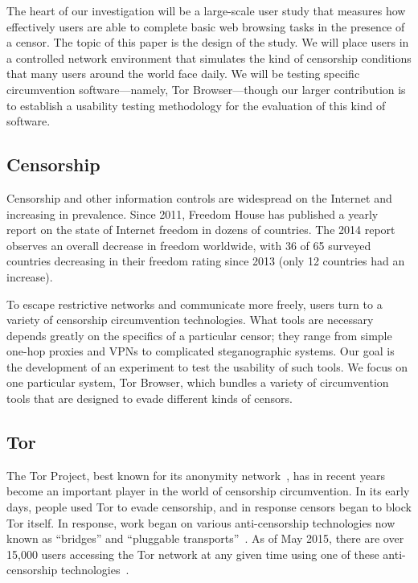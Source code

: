 \documentclass[letterpaper,twocolumn,11pt]{article}
\begin{document}
The heart of our investigation will be a large-scale user study
that measures how effectively users are able to complete
basic web browsing tasks in the presence of a censor.
The topic of this paper is the design of the study.
We will place users in a controlled network environment
that simulates the kind of censorship conditions that many
users around the world face daily.
We will be testing specific circumvention software---namely,
Tor Browser---though our larger contribution is to establish
a usability testing methodology for the evaluation
of this kind of software.

\subsection{Censorship}

\indent \indent Censorship and other information controls
are widespread on the Internet and increasing in prevalence.
Since 2011, Freedom House has published a yearly report
on the state of Internet freedom in dozens of countries.
The 2014 report~\cite{freedom-on-the-net-2014} observes
an overall decrease in freedom worldwide,
with 36 of 65 surveyed countries decreasing in their freedom rating
since 2013 (only 12 countries had an increase).

To escape restrictive networks and communicate more freely,
users turn to a variety of censorship circumvention technologies.
What tools are necessary depends greatly on the specifics of
a particular censor;
they range from simple one-hop proxies and VPNs
to complicated steganographic systems.
Our goal is the development of an experiment
to test the usability of such tools.
We focus on one particular system,
Tor Browser, which bundles a variety of circumvention
tools that are designed to evade different kinds of censors.

\subsection{Tor} 

\indent \indent The Tor Project, best known for its anonymity network~\cite{tor-design},
has in recent years become an important player in the world of
censorship circumvention.
In its early days, people used Tor to evade censorship,
and in response censors began to block Tor itself.
In response, work began on various anti-censorship technologies
now known as ``bridges'' and ``pluggable transports''~\cite{pluggable-transports}.
As of May 2015, there are over 15,000 users accessing the Tor network
at any given time using one of these
anti-censorship technologies~\cite{userstats-bridge-country}.
\end{document}
